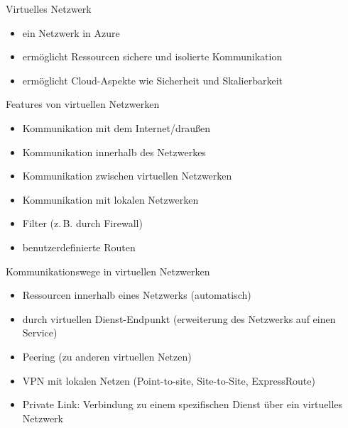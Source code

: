 
\begin{flashcard}[]{Virtuelles Netzwerk}
  \begin{itemize}
    \item ein Netzwerk in Azure
    \item ermöglicht Ressourcen sichere und isolierte Kommunikation
    \item ermöglicht Cloud-Aspekte wie Sicherheit und Skalierbarkeit
  \end{itemize}
\end{flashcard}

\begin{flashcard}[]{Features von virtuellen Netzwerken}
  \begin{itemize}
    \item Kommunikation mit dem Internet/draußen
    \item Kommunikation innerhalb des Netzwerkes
    \item Kommunikation zwischen virtuellen Netzwerken
    \item Kommunikation mit lokalen Netzwerken
    \item Filter (z.\,B. durch Firewall)
    \item benutzerdefinierte Routen
  \end{itemize}
\end{flashcard}

\begin{flashcard}[]{Kommunikationswege in virtuellen Netzwerken}
  \begin{itemize}
    \item Ressourcen innerhalb eines Netzwerks (automatisch)
    \item durch virtuellen Dienst-Endpunkt (erweiterung des Netzwerks auf einen Service)
    \item Peering (zu anderen virtuellen Netzen)
    \item VPN mit lokalen Netzen (Point-to-site, Site-to-Site, ExpressRoute)
    \item Private Link: Verbindung zu einem spezifischen Dienst über ein virtuelles Netzwerk
  \end{itemize}
\end{flashcard}

